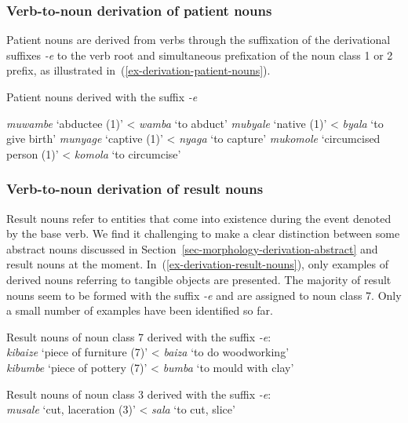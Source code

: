 \subsubsection{Verb-to-noun derivation of patient nouns}

Patient nouns are derived from verbs through the suffixation of the derivational suffixes  \textit{-e}  
to the verb root and simultaneous prefixation of the noun class 1 or 2 prefix, as illustrated in~(\ref{ex-derivation-patient-nouns}).

\ea  Patient nouns derived with the suffix \textit{-e}\label{ex-derivation-patient-nouns}
\begin{xlist}
\ex 	 \textit{muwambe} ‘abductee (1)’ <   \textit{wamba} ‘to abduct’
\ex 	 \textit{mubyale}  ‘native (1)' < 	  \textit{byala} ‘to give birth’
\ex 	  \textit{munyage}  ‘captive (1)’ <   \textit{nyaga} ‘to capture’
\ex 	  \textit{mukomole} ‘circumcised person (1)’  <	 \textit{komola} ‘to circumcise’  
\end{xlist}
\z


\subsubsection{Verb-to-noun derivation of result nouns}
Result nouns refer to entities that come into existence during the event denoted by the base verb. 
We find it challenging to make a clear distinction between some abstract nouns discussed in Section~\ref{sec-morphology-derivation-abstract} and result nouns at the moment. 
In~(\ref{ex-derivation-result-nouns}), only examples of derived nouns referring to tangible objects are presented. 
The majority of result nouns seem to be formed with the suffix  \textit{-e} and are assigned to noun class 7. 
Only a small number of examples have been identified so far.

\ea \label{ex-derivation-result-nouns}
\begin{xlist}
\ex Result nouns of  noun class 7 derived with the suffix  \textit{-e}:\\
	 \textit{kibaize} ‘piece of furniture (7)’ <  \textit{baiza} ‘to do woodworking’ \\ 
	 \textit{kibumbe} ‘piece of pottery (7)’ <  \textit{bumba} ‘to mould with clay’

\ex Result nouns of noun  class 3 derived with the suffix  \textit{-e}:\\
	 \textit{musale} ‘cut, laceration (3)’ <  \textit{sala} ‘to cut, slice’
\end{xlist}
\z

